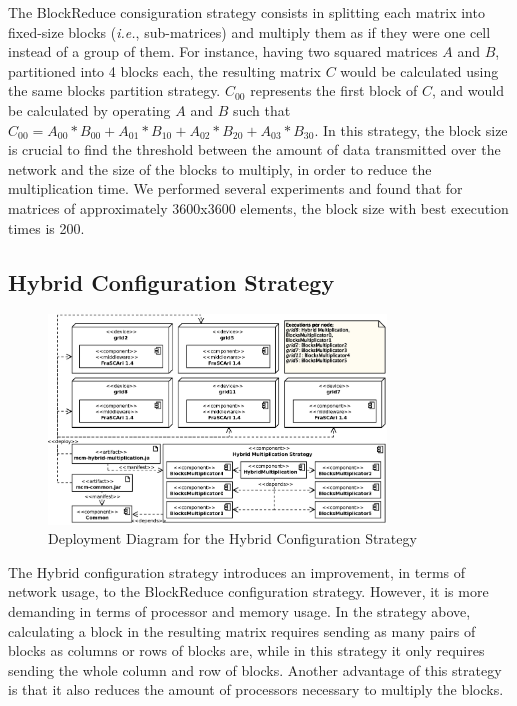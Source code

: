 \documentclass{article}
\begin{document}
The BlockReduce consiguration strategy consists in splitting each matrix into fixed-size blocks (\textit{i.e.}, sub-matrices) and multiply them as if they were one cell instead of a group of them. For instance, having two squared matrices $A$ and $B$, partitioned into 4 blocks each, the resulting matrix $C$ would be calculated using the same blocks partition strategy. $C_{00}$ represents the first block of $C$, and would be calculated by operating $A$ and $B$ such that $C_{00} = A_{00}*B_{00} + A_{01}*B_{10} + A_{02}*B_{20} + A_{03}*B_{30}$. In this strategy, the block size is crucial to find the threshold between the amount of data transmitted over the network and the size of the blocks to multiply, in order to reduce the multiplication time. We performed several experiments and found that for matrices of approximately 3600x3600 elements, the block size with best execution times is 200.

\subsection{Hybrid Configuration Strategy}

\begin{figure}[H]
	\centering
	\includegraphics[width=0.8\textwidth]{fig/evaluation/hybrid-deployment}
	\caption[]{Deployment Diagram for the Hybrid Configuration Strategy}
	\label{fig:apx-eval-amelia-hybrid}
\end{figure}

The Hybrid configuration strategy introduces an improvement, in terms of network usage, to the BlockReduce configuration strategy. However, it is more demanding in terms of processor and memory usage. In the strategy above, calculating a block in the resulting matrix requires sending as many pairs of blocks as columns or rows of blocks are, while in this strategy it only requires sending the whole column and row of blocks. Another advantage of this strategy is that it also reduces the amount of processors necessary to multiply the blocks.
\end{document}
